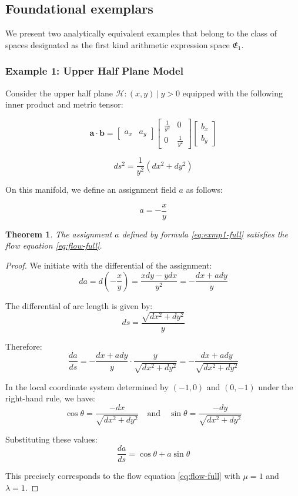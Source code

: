 \documentclass[12pt]{article}
\newtheorem{theorem}{Theorem}[section]
\begin{document}
\subsection{Foundational exemplars}\label{subsec:motivexamples-full}

We present two analytically equivalent examples that belong to the class of spaces designated as the first kind arithmetic expression space $\mathfrak{E}_1$.

\subsubsection{Example 1: Upper Half Plane Model}

Consider the upper half plane ${\mathcal{H}: (x, y) \ | \ y > 0}$ equipped with the following inner product and metric tensor:

$$
\mathbf{a} \cdot \mathbf{b} = \begin{bmatrix} a_x & a_y \end{bmatrix} \begin{bmatrix} \frac{1}{y^2} & 0 \\ 0 & \frac{1}{y^2} \end{bmatrix} \begin{bmatrix} b_x \\ b_y \end{bmatrix}
$$

$$
ds^2 = \frac{1}{y^2} (dx^2 + dy^2)
$$

On this manifold, we define an assignment field $a$ as follows:

\begin{equation}\label{eq:exmp1-full}
a = - \frac{x}{y}
\end{equation}

\begin{theorem}\label{thm:exmp1-full}
The assignment $a$ defined by formula \eqref{eq:exmp1-full} satisfies the flow equation \eqref{eq:flow-full}.
\end{theorem}

\begin{proof}
We initiate with the differential of the assignment:
$$
da = d\left(-\frac{x}{y}\right) = \frac{xdy - ydx}{y^2} = -\frac{dx + ady}{y}
$$

The differential of arc length is given by:
$$
ds = \frac{\sqrt{dx^2 + dy^2}}{y}
$$

Therefore:
$$
\frac{da}{ds} = - \frac{dx + ady}{y} \cdot \frac{y}{\sqrt{dx^2 + dy^2}} = - \frac{dx + ady}{\sqrt{dx^2 + dy^2}}
$$

In the local coordinate system determined by $(-1, 0)$ and $(0, -1)$ under the right-hand rule, we have:
$$
\cos \theta = \frac{-dx}{\sqrt{dx^2 + dy^2}} \quad \text{and} \quad \sin \theta = \frac{-dy}{\sqrt{dx^2 + dy^2}}
$$

Substituting these values:
$$
\frac{da}{ds} = \cos \theta + a \sin \theta
$$

This precisely corresponds to the flow equation \eqref{eq:flow-full} with $\mu=1$ and $\lambda=1$.
\end{proof}
\end{document}
